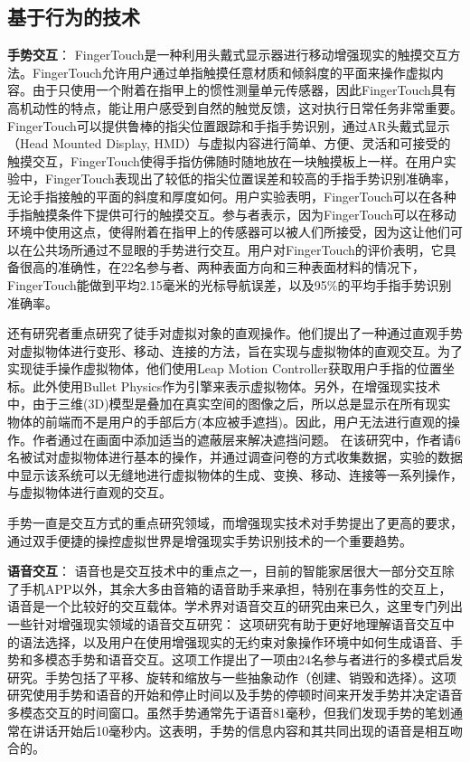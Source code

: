 \subsection{基于行为的技术}
\textbf{手势交互}：
FingerTouch\cite{OhParPar20}是一种利用头戴式显示器进行移动增强现实的触摸交互方法。FingerTouch允许用户通过单指触摸任意材质和倾斜度的平面来操作虚拟内容。由于只使用一个附着在指甲上的惯性测量单元传感器，因此FingerTouch具有高机动性的特点，能让用户感受到自然的触觉反馈，这对执行日常任务非常重要。
FingerTouch可以提供鲁棒的指尖位置跟踪和手指手势识别，通过AR头戴式显示（Head Mounted Display, HMD）与虚拟内容进行简单、方便、灵活和可接受的触摸交互，FingerTouch使得手指仿佛随时随地放在一块触摸板上一样。在用户实验中，FingerTouch表现出了较低的指尖位置误差和较高的手指手势识别准确率，无论手指接触的平面的斜度和厚度如何。用户实验表明，FingerTouch可以在各种手指触摸条件下提供可行的触摸交互。参与者表示，因为FingerTouch可以在移动环境中使用这点，使得附着在指甲上的传感器可以被人们所接受，因为这让他们可以在公共场所通过不显眼的手势进行交互。用户对FingerTouch的评价表明，它具备很高的准确性，在22名参与者、两种表面方向和三种表面材料的情况下，FingerTouch能做到平均2.15毫米的光标导航误差，以及95\%的平均手指手势识别准确率。

还有研究者\cite{SakIshHor20}重点研究了徒手对虚拟对象的直观操作。他们提出了一种通过直观手势对虚拟物体进行变形、移动、连接的方法，旨在实现与虚拟物体的直观交互。为了实现徒手操作虚拟物体，他们使用Leap Motion Controller\cite{ultraleap}获取用户手指的位置坐标。此外使用Bullet Physics\cite{BulletPhysics}作为引擎来表示虚拟物体。另外，在增强现实技术中，由于三维(3D)模型是叠加在真实空间的图像之后，所以总是显示在所有现实物体的前端而不是用户的手部后方(本应被手遮挡)。因此，用户无法进行直观的操作。作者通过在画面中添加适当的遮蔽层来解决遮挡问题。
在该研究中，作者请6名被试对虚拟物体进行基本的操作，并通过调查问卷的方式收集数据，实验的数据中显示该系统可以无缝地进行虚拟物体的生成、变换、移动、连接等一系列操作，与虚拟物体进行直观的交互。

手势一直是交互方式的重点研究领域，而增强现实技术对手势提出了更高的要求，通过双手便捷的操控虚拟世界是增强现实手势识别技术的一个重要趋势。

\textbf{语音交互}：
语音也是交互技术中的重点之一，目前的智能家居很大一部分交互除了手机APP以外，其余大多由音箱的语音助手来承担，特别在事务性的交互上，语音是一个比较好的交互载体。学术界对语音交互的研究由来已久，这里专门列出一些针对增强现实领域的语音交互研究：
这项研究\cite{WilOrt20}有助于更好地理解语音交互中的语法选择，以及用户在使用增强现实的无约束对象操作环境中如何生成语音、手势和多模态手势和语音交互。这项工作提出了一项由24名参与者进行的多模式启发研究。手势包括了平移、旋转和缩放与一些抽象动作（创建、销毁和选择）。这项研究使用手势和语音的开始和停止时间以及手势的停顿时间来开发手势并决定语音多模态交互的时间窗口。虽然手势通常先于语音81毫秒，但我们发现手势的笔划通常在讲话开始后10毫秒内。这表明，手势的信息内容和其共同出现的语音是相互吻合的。

